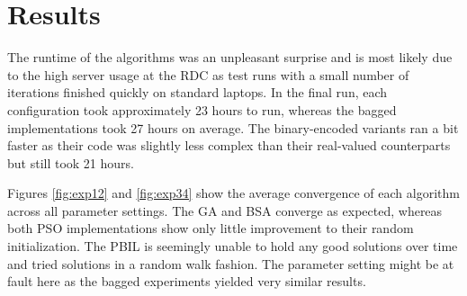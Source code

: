 \section{Results}
\label{results}
The runtime of the algorithms was an unpleasant surprise and is most likely due to the high server usage at the RDC as test runs with a small number of iterations finished quickly on standard laptops. In the final run, each configuration took approximately 23 hours to run, whereas the bagged implementations took 27 hours on average. The binary-encoded variants ran a bit faster as their code was slightly less complex than their real-valued counterparts but still took 21 hours.

Figures \ref{fig:exp12} and \ref{fig:exp34} show the average convergence of each algorithm across all parameter settings. The GA and BSA converge as expected, whereas both PSO implementations show only little improvement to their random initialization. The PBIL is seemingly unable to hold any good solutions over time and tried solutions in a random walk fashion. The parameter setting might be at fault here as the bagged experiments yielded very similar results. %


